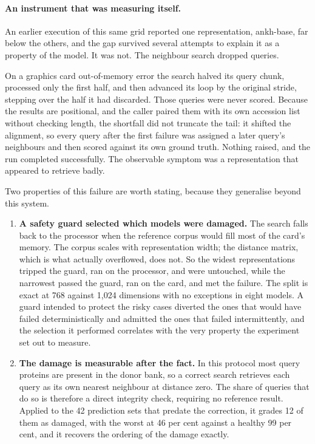 \paragraph{An instrument that was measuring itself.}
An earlier execution of this same grid reported one representation, ankh-base,
far below the others, and the gap survived several attempts to explain it as a
property of the model. It was not. The neighbour search dropped queries.

On a graphics card out-of-memory error the search halved its query chunk,
processed only the first half, and then advanced its loop by the original stride,
stepping over the half it had discarded. Those queries were never scored. Because
the results are positional, and the caller paired them with its own accession list
without checking length, the shortfall did not truncate the tail: it shifted the
alignment, so every query after the first failure was assigned a later query's
neighbours and then scored against its own ground truth. Nothing raised, and the
run completed successfully. The observable symptom was a representation that
appeared to retrieve badly.

Two properties of this failure are worth stating, because they generalise beyond
this system.

\begin{enumerate}
  \item \textbf{A safety guard selected which models were damaged.} The search
    falls back to the processor when the reference corpus would fill most of the
    card's memory. The corpus scales with representation width; the distance
    matrix, which is what actually overflowed, does not. So the widest
    representations tripped the guard, ran on the processor, and were untouched,
    while the narrowest passed the guard, ran on the card, and met the failure.
    The split is exact at 768 against 1{,}024 dimensions with no exceptions in
    eight models. A guard intended to protect the risky cases diverted the ones
    that would have failed deterministically and admitted the ones that failed
    intermittently, and the selection it performed correlates with the very
    property the experiment set out to measure.
  \item \textbf{The damage is measurable after the fact.} In this protocol most
    query proteins are present in the donor bank, so a correct search retrieves
    each query as its own nearest neighbour at distance zero. The share of queries
    that do so is therefore a direct integrity check, requiring no reference
    result. Applied to the 42 prediction sets that predate the correction, it
    grades 12 of them as damaged, with the worst at 46 per cent against a healthy
    99 per cent, and it recovers the ordering of the damage exactly.
\end{enumerate}

